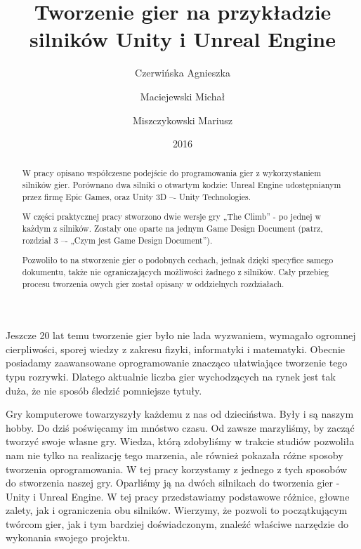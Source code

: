 \documentclass[brudnopis]{xmgr}
\author   {Czerwińska Agnieszka}
\author   {Maciejewski Michał}
\author   {Miszczykowski Mariusz}
\title    {Tworzenie gier na przykładzie silników Unity i Unreal Engine}
\date     {2016}
\begin{document}
\begin{abstract}
 W pracy opisano współczesne podejście do programowania gier z wykorzystaniem silników gier.
 Porównano dwa silniki o otwartym kodzie: Unreal Engine udostępnianym przez firmę Epic Games, oraz Unity 3D –- Unity Technologies. 

 W części praktycznej pracy stworzono dwie wersje gry „The Climb” - po jednej w każdym z silników. Zostały one oparte na jednym Game Design Document (patrz, rozdział 3 –- „Czym jest Game Design Document”).

 Pozwoliło to na stworzenie gier o podobnych cechach, jednak dzięki specyfice samego dokumentu, także nie ograniczających możliwości żadnego z silników. Cały przebieg procesu tworzenia owych gier został opisany w oddzielnych rozdziałach.
\end{abstract}


\maketitle

\introduction

Jeszcze 20 lat temu tworzenie gier było nie lada wyzwaniem, wymagało ogromnej cierpliwości, sporej wiedzy z zakresu fizyki, informatyki i matematyki. Obecnie posiadamy zaawansowane oprogramowanie znacząco ułatwiające tworzenie tego typu rozrywki. Dlatego aktualnie liczba gier wychodzących na rynek jest tak duża, że nie sposób śledzić pomniejsze tytuły.

Gry komputerowe towarzyszyły każdemu z nas od dzieciństwa. Były i są naszym hobby. Do dziś poświęcamy im mnóstwo czasu. Od zawsze marzyliśmy, by zacząć tworzyć swoje własne gry.
Wiedza, którą zdobyliśmy w trakcie studiów pozwoliła nam nie tylko na realizację tego marzenia, ale również pokazała różne sposoby tworzenia oprogramowania. W tej pracy korzystamy z jednego z tych sposobów do stworzenia naszej gry. Oparliśmy ją na dwóch silnikach do tworzenia gier - Unity i Unreal Engine. W tej pracy przedstawiamy podstawowe różnice, głowne zalety, jak i ograniczenia obu silników. Wierzymy, że pozwoli to początkującym twórcom gier, jak i tym bardziej doświadczonym, znaleźć właściwe narzędzie do wykonania swojego projektu.
\end{document}
